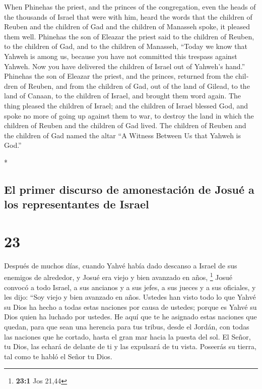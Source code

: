 \begin{paracol}{2}
\begin{otherlanguage}{english}
 When Phinehas the priest, and the princes of the
congregation, even the heads of the thousands of Israel that were with
him, heard the words that the children of Reuben and the children of Gad
and the children of Manasseh spoke, it pleased them well.
 Phinehas the son of Eleazar the priest said to the
children of Reuben, to the children of Gad, and to the children of
Manasseh, ``Today we know that Yahweh is among us, because you have not
committed this trespass against Yahweh. Now you have delivered the
children of Israel out of Yahweh's hand.''  Phinehas the
son of Eleazar the priest, and the princes, returned from the children
of Reuben, and from the children of Gad, out of the land of Gilead, to
the land of Canaan, to the children of Israel, and brought them word
again.  The thing pleased the children of Israel; and the
children of Israel blessed God, and spoke no more of going up against
them to war, to destroy the land in which the children of Reuben and the
children of Gad lived.  The children of Reuben and the
children of Gad named the altar ``A Witness Between Us that Yahweh is
God.''

\end{otherlanguage}

\switchcolumn[0]*

\hypertarget{el-primer-discurso-de-amonestaciuxf3n-de-josuuxe9-a-los-representantes-de-israel}{%
\subsection{El primer discurso de amonestación de Josué a los
representantes de
Israel}\label{el-primer-discurso-de-amonestaciuxf3n-de-josuuxe9-a-los-representantes-de-israel}}

\hypertarget{section-44}{%
\section{23}\label{section-44}}

 Después de muchos días, cuando Yahvé había dado descanso
a Israel de sus enemigos de alrededor, y Josué era viejo y bien avanzado
en años, \footnote{\textbf{23:1} Jos 21,44}  Josué convocó
a todo Israel, a sus ancianos y a sus jefes, a sus jueces y a sus
oficiales, y les dijo: ``Soy viejo y bien avanzado en años.
 Ustedes han visto todo lo que Yahvé su Dios ha hecho a
todas estas naciones por causa de ustedes; porque es Yahvé su Dios quien
ha luchado por ustedes.  He aquí que te he asignado estas
naciones que quedan, para que sean una herencia para tus tribus, desde
el Jordán, con todas las naciones que he cortado, hasta el gran mar
hacia la puesta del sol.  El Señor, tu Dios, las echará de
delante de ti y las expulsará de tu vista. Poseerás su tierra, tal como
te habló el Señor tu Dios.


\end{paracol}
